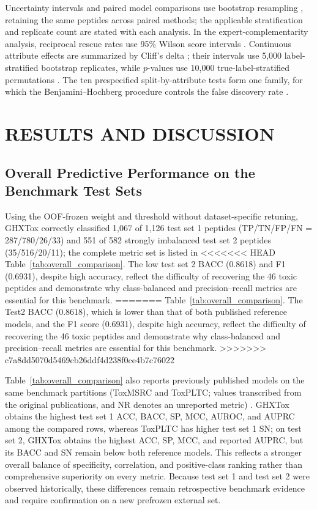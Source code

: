 \documentclass[12pt]{article}
\begin{document}
Uncertainty intervals and paired model comparisons use bootstrap resampling
\cite{efron1993bootstrap}, retaining the same peptides across paired methods;
the applicable stratification and replicate count are stated with each
analysis. In the expert-complementarity analysis, reciprocal rescue rates use
95\% Wilson score intervals \cite{wilson1927}. Continuous attribute effects
are summarized by Cliff's delta \cite{cliff1993}; their intervals use 5{,}000
label-stratified bootstrap replicates, while $p$-values use 10{,}000
true-label-stratified permutations \cite{ojala2010permutation}. The ten
prespecified split-by-attribute tests form one family, for which the
Benjamini--Hochberg procedure controls the false discovery rate
\cite{benjamini1995fdr}.
\section{RESULTS AND DISCUSSION}
\subsection{Overall Predictive Performance on the Benchmark Test Sets}
Using the OOF-frozen weight and threshold without dataset-specific retuning,
GHXTox correctly classified 1{,}067 of 1{,}126 test set 1 peptides
(TP/TN/FP/FN = 287/780/26/33) and 551 of 582 strongly imbalanced test set 2
peptides (35/516/20/11); the complete metric set is listed in
<<<<<<< HEAD
Table~\ref{tab:overall_comparison}. The low test set 2 BACC (0.8618) and F1
(0.6931), despite high accuracy, reflect the difficulty of recovering the 46
toxic peptides and demonstrate why class-balanced and precision--recall
metrics are essential for this benchmark.
=======
Table~\ref{tab:overall_comparison}. The Test2 BACC (0.8618), which is lower
than that of both published reference models, and the F1 score (0.6931),
despite high accuracy, reflect the difficulty of recovering the 46 toxic
peptides and demonstrate why class-balanced and precision--recall metrics are
essential for this benchmark.
>>>>>>> c7a8dd5070d5469cb26ddf4d238f0ce4b7c76022

Table~\ref{tab:overall_comparison} also reports previously published models on
the same benchmark partitions (ToxMSRC and ToxPLTC; values transcribed from
the original publications, and NR denotes an unreported metric)
\cite{zhang2025toxmsrc,liang2026toxpltc}. GHXTox obtains the highest test set 1
ACC, BACC, SP, MCC, AUROC, and AUPRC among the compared rows, whereas ToxPLTC
has higher test set 1 SN; on test set 2, GHXTox obtains the highest ACC, SP, MCC, and
reported AUPRC, but its BACC and SN remain below both reference models. This
reflects a stronger overall balance of specificity, correlation, and
positive-class ranking rather than comprehensive superiority on every metric.
Because test set 1 and test set 2 were observed historically, these differences remain
retrospective benchmark evidence and require confirmation on a new prefrozen
external set.
\end{document}
